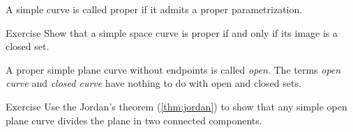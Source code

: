A simple curve is called proper if it admits a proper parametrization.

\begin{thm}{Exercise}\label{ex:proper-closed}
Show that a simple space curve is proper if and only if its image is a closed set.

\end{thm}

A proper simple plane curve without endpoints is called \emph{open}.
The terms {}\emph{open curve} and {}\emph{closed curve} have nothing to do with open and closed sets.

\begin{thm}{Exercise}\label{ex:proper-curve}
Use the Jordan's theorem (\ref{thm:jordan}) to show that any simple open plane curve divides the plane in two connected components.  
\end{thm}



